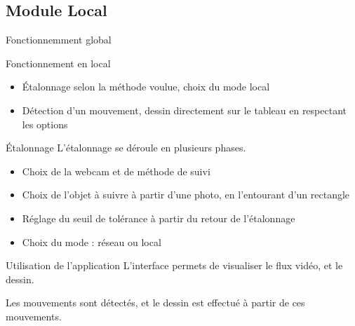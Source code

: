 \documentclass{beamer}
\begin{document}
            
      \subsection{Module Local}
            \begin{frame}{Fonctionnemment global}
                  \begin{block}{Fonctionnement en local}
                        \begin{itemize}
                        \item Étalonnage selon la méthode voulue, choix du mode local
                        \item Détection d'un mouvement, dessin directement sur le tableau en respectant les options
                        \end{itemize}
                  \end{block}
            \end{frame}
            
            \begin{frame}{Étalonnage}
                  L'étalonnage se déroule en plusieurs phases.
                  \begin{itemize}
                  \item Choix de la webcam et de méthode de suivi
                  \item Choix de l'objet à suivre à partir d'une photo, en l'entourant d'un rectangle
                  \item Réglage du seuil de tolérance à partir du retour de l'étalonnage
                  \item Choix du mode : réseau ou local
                  \end{itemize}
            \end{frame}
            
            \begin{frame}{Utilisation de l'application}
            L'interface permets de visualiser le flux vidéo, et le dessin.
            
            Les mouvements sont détectés, et le dessin est effectué à partir de ces mouvements.
            \end{frame}
            
\end{document}
